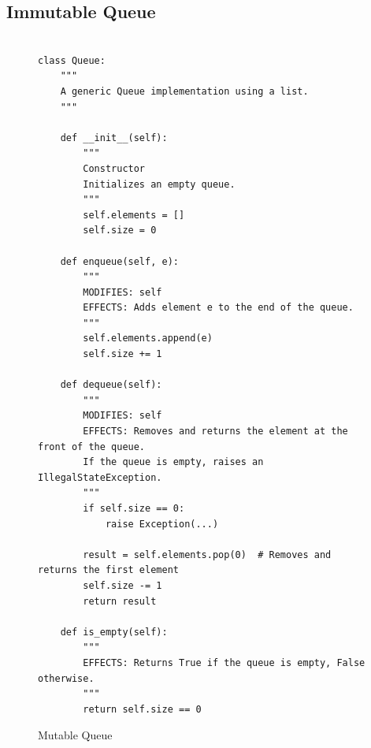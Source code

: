 \documentclass[oneside,11pt,dvipsnames]{book}
\begin{document}
    
    
    
    








\subsection{Immutable Queue}\label{exercise:immutable-queue}


\begin{figure}
    \begin{lstlisting}

class Queue:
    """
    A generic Queue implementation using a list.
    """

    def __init__(self):
        """
        Constructor
        Initializes an empty queue.
        """
        self.elements = []
        self.size = 0

    def enqueue(self, e):
        """
        MODIFIES: self
        EFFECTS: Adds element e to the end of the queue.
        """
        self.elements.append(e)
        self.size += 1

    def dequeue(self):
        """
        MODIFIES: self
        EFFECTS: Removes and returns the element at the front of the queue.
        If the queue is empty, raises an IllegalStateException.
        """
        if self.size == 0:
            raise Exception(...)

        result = self.elements.pop(0)  # Removes and returns the first element
        self.size -= 1
        return result

    def is_empty(self):
        """
        EFFECTS: Returns True if the queue is empty, False otherwise.
        """
        return self.size == 0

    \end{lstlisting}
    \caption{Mutable Queue}\label{ex:mutable-queue}
\end{figure}
\end{document}
